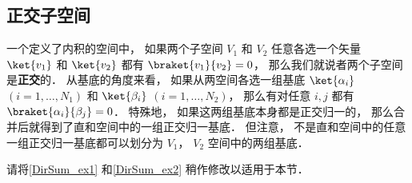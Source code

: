 \subsection{正交子空间}
一个定义了内积的空间中， 如果两个子空间 $V_1$ 和 $V_2$ 任意各选一个矢量 $\ket{v_1}$ 和 $\ket{v_2}$ 都有 $\braket{v_1}{v_2} = 0$， 那么我们就说者两个子空间是\textbf{正交}的． 从基底的角度来看， 如果从两空间各选一组基底 $\ket{\alpha_i}$ $(i = 1, \dots, N_1)$ 和 $\ket{\beta_i}$ $(i = 1, \dots, N_2)$， 那么有对任意 $i, j$ 都有 $\braket{\alpha_i}{\beta_j} = 0$． 特殊地， 如果这两组基底本身都是正交归一的， 那么合并后就得到了直和空间中的一组正交归一基底． 但注意， 不是直和空间中的任意一组正交归一基底都可以划分为 $V_1$， $V_2$ 空间中的两组基底．

\begin{exercise}{}
请将\autoref{DirSum_ex1} 和\autoref{DirSum_ex2} 稍作修改以适用于本节．
\end{exercise}
